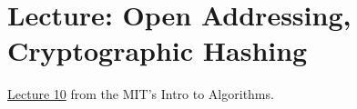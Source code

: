 \chapter{Lecture: Open Addressing, Cryptographic Hashing}
\href{https://ocw.mit.edu/courses/electrical-engineering-and-computer-science/6-006-introduction-to-algorithms-fall-2011/lecture-videos/lecture-10-open-addressing-cryptographic-hashing/}{Lecture 10} 
from the MIT's  Intro to Algorithms.